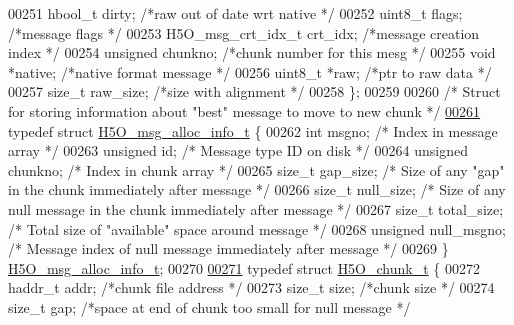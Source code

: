 \begin{DoxyCode}
00251     hbool\_t     dirty;      \textcolor{comment}{/*raw out of date wrt native         */}
00252     uint8\_t     flags;      \textcolor{comment}{/*message flags              */}
00253     H5O\_msg\_crt\_idx\_t   crt\_idx;        \textcolor{comment}{/*message creation index         */}
00254     \textcolor{keywordtype}{unsigned}        chunkno;    \textcolor{comment}{/*chunk number for this mesg         */}
00255     \textcolor{keywordtype}{void}        *native;    \textcolor{comment}{/*native format message          */}
00256     uint8\_t     *raw;       \textcolor{comment}{/*ptr to raw data            */}
00257     \textcolor{keywordtype}{size\_t}      raw\_size;   \textcolor{comment}{/*size with alignment            */}
00258 \};
00259 
00260 \textcolor{comment}{/* Struct for storing information about "best" message to move to new chunk */}
\hyperlink{struct_h5_o__msg__alloc__info__t}{00261} \textcolor{keyword}{typedef} \textcolor{keyword}{struct }\hyperlink{struct_h5_o__msg__alloc__info__t}{H5O\_msg\_alloc\_info\_t} \{
00262     \textcolor{keywordtype}{int} msgno;                      \textcolor{comment}{/* Index in message array */}
00263     \textcolor{keywordtype}{unsigned} id;            \textcolor{comment}{/* Message type ID on disk */}
00264     \textcolor{keywordtype}{unsigned} chunkno;               \textcolor{comment}{/* Index in chunk array */}
00265     \textcolor{keywordtype}{size\_t} gap\_size;                \textcolor{comment}{/* Size of any "gap" in the chunk immediately after message */}
00266     \textcolor{keywordtype}{size\_t} null\_size;               \textcolor{comment}{/* Size of any null message in the chunk immediately after message */}
00267     \textcolor{keywordtype}{size\_t} total\_size;              \textcolor{comment}{/* Total size of "available" space around message */}
00268     \textcolor{keywordtype}{unsigned} null\_msgno;            \textcolor{comment}{/* Message index of null message immediately after message */}
00269 \} \hyperlink{struct_h5_o__msg__alloc__info__t}{H5O\_msg\_alloc\_info\_t};
00270 
\hyperlink{struct_h5_o__chunk__t}{00271} \textcolor{keyword}{typedef} \textcolor{keyword}{struct }\hyperlink{struct_h5_o__chunk__t}{H5O\_chunk\_t} \{
00272     haddr\_t addr;           \textcolor{comment}{/*chunk file address             */}
00273     \textcolor{keywordtype}{size\_t}  size;           \textcolor{comment}{/*chunk size                 */}
00274     \textcolor{keywordtype}{size\_t}  gap;            \textcolor{comment}{/*space at end of chunk too small for null message */}

\end{DoxyCode}
